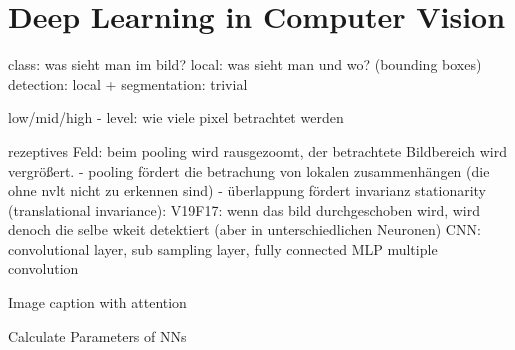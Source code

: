 \section{Deep Learning in Computer Vision}
\label{sect:deep-learning-in-computer-vison}
class: was sieht man im bild?
local: was sieht man und wo? (bounding boxes)
detection: local + 
segmentation: trivial

low/mid/high - level: wie viele pixel betrachtet werden

rezeptives Feld: beim pooling wird rausgezoomt, der betrachtete Bildbereich wird vergrößert.
- pooling fördert die betrachung von lokalen zusammenhängen (die ohne nvlt nicht zu erkennen sind)
- überlappung fördert invarianz
 stationarity (translational invariance): 
 	V19F17: wenn das bild durchgeschoben wird, wird denoch die selbe wkeit detektiert (aber in unterschiedlichen Neuronen)
CNN: convolutional layer, sub sampling layer, fully connected MLP
multiple convolution

Image caption with attention

Calculate Parameters of NNs

\newpage